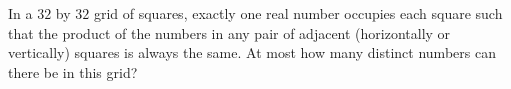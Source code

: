 In a $32$ by $32$ grid of squares, exactly one real number occupies each square such that the product of the numbers in any pair of adjacent (horizontally or vertically) squares is always the same. At most how many distinct numbers can there be in this grid?
